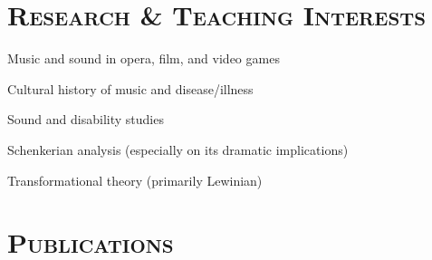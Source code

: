 \documentclass[a4paper,11pt]{article}
\begin{document}
  \vspace{5mm}
  
  \section*{\textsc{Research \& Teaching Interests}}
  
  \hspace{2mm} \textbullet \hspace{2mm} Music and sound in opera, film, and video games
  
  \noindent \hspace{2mm} \textbullet \hspace{2mm} Cultural history of music and disease/illness
  
  \noindent \hspace{2mm} \textbullet \hspace{2mm} Sound and disability studies
  
  \noindent \hspace{2mm} \textbullet \hspace{2mm} Schenkerian analysis (especially on its dramatic implications)
  
  \noindent \hspace{2mm} \textbullet \hspace{2mm} Transformational theory (primarily Lewinian)
  
  \section*{\textsc{Publications}}
\end{document}
